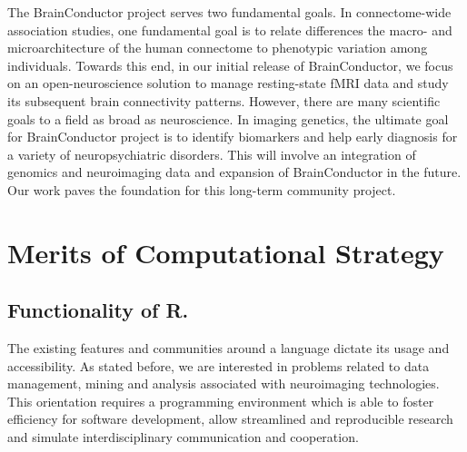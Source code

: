 \documentclass{nature}
\begin{document}
The BrainConductor project serves two fundamental goals. In connectome-wide
association studies, one fundamental goal is to relate differences the macro- and
microarchitecture of the human connectome to phenotypic variation among
individuals\cite{milham2012open}. Towards this end,
in our
initial release of BrainConductor, we focus on an open-neuroscience
solution to manage resting-state fMRI data and study its
subsequent brain connectivity patterns.
However, there are many scientific goals to a field as broad as neuroscience.
In imaging genetics, the ultimate goal
for BrainConductor project is to identify biomarkers and help early diagnosis
for a variety of neuropsychiatric disorders. This will involve an
integration of genomics and neuroimaging data and expansion of BrainConductor
in the future. Our work paves the foundation for this long-term community 
project.


\section{Merits of Computational Strategy}

\subsection{Functionality of R.}
The existing features and communities around a language dictate
its usage and accessibility. As stated before, we are
interested in problems related to data management, mining and analysis
associated with neuroimaging technologies. This orientation requires
a programming environment which is able to foster
efficiency for software development, allow
streamlined and reproducible research and simulate
interdisciplinary communication and cooperation.
\end{document}
